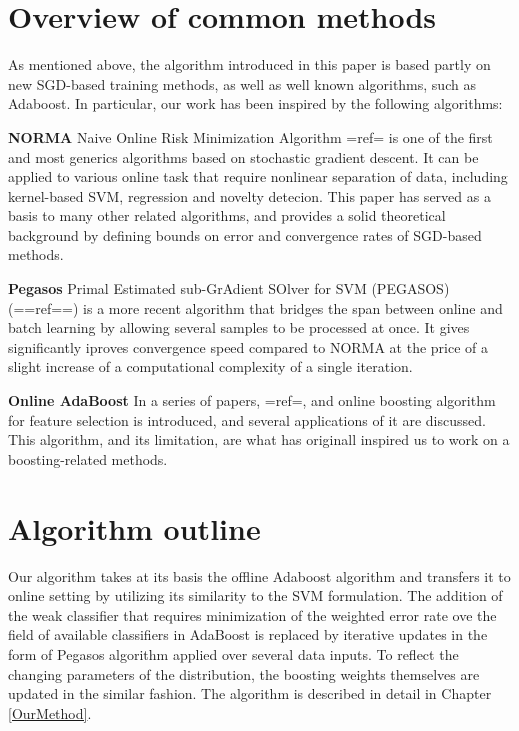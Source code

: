 \section{Overview of common methods} %
As mentioned above, the algorithm introduced in this paper is based partly on new SGD-based training methods, as well as well known algorithms, such as Adaboost. In particular, our work has been inspired by the following algorithms:

{\bf NORMA} Naive Online Risk Minimization Algorithm {{=ref=}} is one of the first and most generics algorithms based on stochastic gradient descent. It can be applied to various online task that require nonlinear separation of data, including kernel-based SVM, regression and novelty detecion. This paper has served as a basis to many other related algorithms, and provides a solid theoretical background by defining bounds on error and convergence rates of SGD-based methods.

{\bf Pegasos } Primal Estimated sub-GrAdient SOlver for SVM (PEGASOS) ({{==ref==}}) is a more recent algorithm that bridges the span between online and batch learning by allowing several samples to be processed at once. It gives significantly iproves convergence speed compared to NORMA at the price of a slight increase of a computational complexity of a single iteration. 

{\bf Online AdaBoost} In a series of papers, {{=ref=}}, and online boosting algorithm for feature selection is introduced, and several applications of it are discussed. This algorithm, and its limitation, are what has originall inspired us to work on a boosting-related methods.


\section{Algorithm outline}

Our algorithm takes at its basis the offline Adaboost algorithm and transfers it to online setting by utilizing its similarity to the SVM formulation. The addition of the weak classifier that requires minimization of the weighted error rate ove the field of available classifiers in AdaBoost is replaced by iterative updates in the form of Pegasos algorithm applied over several data inputs. To reflect the changing parameters of the distribution, the boosting weights themselves are updated in the similar fashion.  The algorithm is described in detail in Chapter \ref{OurMethod}. 
